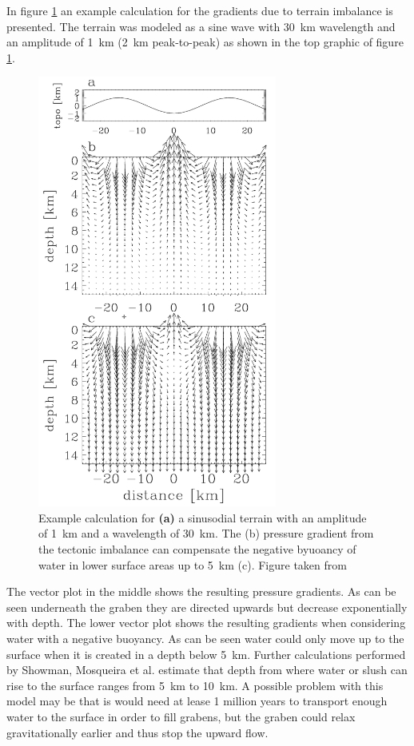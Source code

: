 In figure \ref{fig:gradients} an example calculation for the gradients
due to terrain imbalance is presented. The terrain was modeled as
a sine wave with 30~km wavelength and an amplitude of 1~km (2~km
peak-to-peak) as shown in the top graphic of figure \ref{fig:gradients}.
\begin{figure}
\begin{centering}
\includegraphics[width=0.7\textwidth]{Figures/gradients}
\par\end{centering}

\caption{Example calculation for \textbf{(a)} a sinusodial terrain with an
amplitude of 1~km and a wavelength of 30~km. The (b) pressure gradient
from the tectonic imbalance can compensate the negative byuoancy of
water in lower surface areas up to 5~km (c). Figure taken from \cite{Showman2004}\label{fig:gradients}}


\end{figure}
 The vector plot in the middle shows the resulting pressure gradients.
As can be seen underneath the graben they are directed upwards but
decrease exponentially with depth. The lower vector plot shows the
resulting gradients when considering water with a negative buoyancy.
As can be seen water could only move up to the surface when it is
created in a depth below 5~km. Further calculations performed by
Showman, Mosqueira et al. estimate that depth from where water or
slush can rise to the surface ranges from 5~km to 10~km. A possible
problem with this model may be that is would need at lease 1 million
years to transport enough water to the surface in order to fill grabens,
but the graben could relax gravitationally earlier and thus stop the
upward flow\cite{Showman2004}. 

